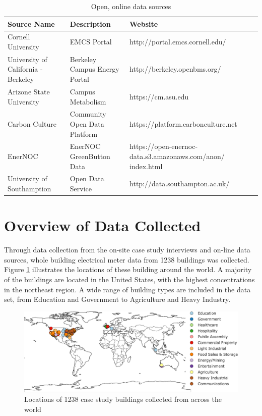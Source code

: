 \begin{table} 
\label{tab:opendata}
    \begin{tabular}{| p{4cm} | p{4cm} | p{6cm} |}
        \textbf{Source Name} & \textbf{Description} & \textbf{Website}\\
        \hline
        Cornell University & EMCS Portal & http://portal.emcs.cornell.edu/ \\ 
        \hline
        University of California - Berkeley & Berkeley Campus Energy Portal & http://berkeley.openbms.org/\\ 
        \hline
        Arizone State University & Campus Metabolism & https://cm.asu.edu \\ 
        \hline
        Carbon Culture & Community Open Data Platform & https://platform.carbonculture.net \\ 
        \hline
        EnerNOC & EnerNOC GreenButton Data & https://open-enernoc-data.s3.amazonaws.com/anon/ index.html \\         
        \hline
        University of Southamption & Open Data Service & http://data.southampton.ac.uk/\\         
        \hline
    \end{tabular} 
    \caption{Open, online data sources} 
\end{table}


\section{Overview of Data Collected}
\label{sec:datacollected}

Through data collection from the on-site case study interviews and on-line data sources, whole building electrical meter data from 1238 buildings was collected. Figure \ref{fig:casestudymap} illustrates the locations of these building around the world. A majority of the buildings are located in the United States, with the highest concentrations in the northeast region. A wide range of building types are included in the data set, from Education and Government to Agriculture and Heavy Industry. 


\begin{figure}[ht!]
\begin{center}
\includegraphics[width=0.98\columnwidth]{figures/casestudybuildinglocations/casestudybuildinglocations}
\caption{Locations of 1238 case study buildings collected from across the world
\label{fig:casestudymap}%
}
\end{center}
\end{figure}

